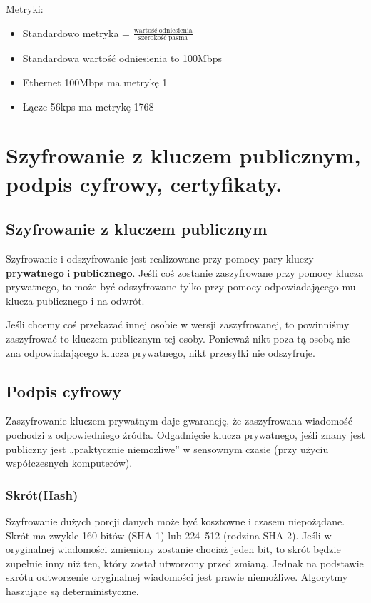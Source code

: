 \documentclass[main.tex]{subfiles}
\begin{document}
    Metryki:
    \begin{itemize}
        \item Standardowo metryka = $\frac{\mathrm{wartość\ odniesienia}}{\mathrm{szerokość\ pasma}}$
        \item Standardowa wartość odniesienia to 100Mbps
        \item Ethernet 100Mbps ma metrykę 1
        \item Łącze 56kps ma metrykę 1768
    \end{itemize}

    \newpage

    \section{Szyfrowanie z kluczem publicznym, podpis cyfrowy, certyfikaty.}
    \subsection{Szyfrowanie z kluczem publicznym}
    Szyfrowanie i odszyfrowanie jest realizowane przy pomocy pary kluczy - \textbf{prywatnego} i \textbf{publicznego}.
    Jeśli coś zostanie zaszyfrowane przy pomocy klucza prywatnego, to może być odszyfrowane tylko przy pomocy odpowiadającego mu klucza publicznego i na odwrót.

    Jeśli chcemy coś przekazać innej osobie w wersji zaszyfrowanej, to powinniśmy zaszyfrować to kluczem publicznym tej osoby. Ponieważ nikt poza tą osobą nie
    zna odpowiadającego klucza prywatnego, nikt przesyłki nie odszyfruje.

    \subsection{Podpis cyfrowy}

    Zaszyfrowanie kluczem prywatnym daje gwarancję, że zaszyfrowana wiadomość pochodzi z odpowiedniego źródła.
    Odgadnięcie klucza prywatnego, jeśli znany jest publiczny jest „praktycznie niemożliwe” w sensownym czasie (przy użyciu współczesnych komputerów).


    \subsubsection{Skrót(Hash)}
    Szyfrowanie dużych porcji danych może być kosztowne i czasem niepożądane. Skrót ma zwykle 160 bitów (SHA-1) lub 224--512 (rodzina SHA-2).
    Jeśli w oryginalnej wiadomości zmieniony zostanie chociaż jeden bit, to skrót będzie zupełnie inny niż ten, który został
    utworzony przed zmianą. Jednak na podstawie skrótu odtworzenie oryginalnej wiadomości jest prawie niemożliwe. Algorytmy haszujące są deterministyczne.
\end{document}
